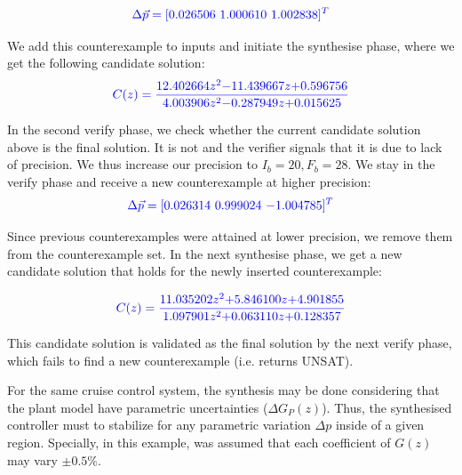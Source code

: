 \documentclass{sig-alternate-05-2015}
\newcommand{\blue}[1]{{\color{blue}#1}}
\newcommand{\red}[1]{{\color{red}#1}}
\begin{document}
$$
\blue{
\Delta{\vec{p}} = [0.026506~ 1.000610~ 1.002838]^T
}
$$



We add this counterexample to {\sc inputs} and initiate the {\sc synthesise} phase, where we get the following candidate solution: 
$$
\blue{
C(z)=\frac{12.402664z^2{-}11.439667z{+}0.596756}{4.003906z^2{-}0.287949z{+}0.015625}
}
$$

In the second {\sc verify} phase, we check whether the current candidate
solution above is the final solution. It is not and the verifier signals
that it is due to lack of precision. We thus increase our precision to
$I_b=20,F_b=28$.
%
We stay in the {\sc verify} phase and receive a new counterexample at
higher precision:
%
$$
\blue{
\Delta{\vec{p}} = [0.026314~ 0.999024~ {-}1.004785]^T
}
$$

Since previous counterexamples were attained at lower precision, we 
remove them from the counterexample set. In the next {\sc synthesise}
phase, we get a new candidate solution that holds for the newly
inserted counterexample:

$$
\blue{
C(z)=\frac{11.035202z^2{+}5.846100z{+}4.901855}{1.097901z^2{+}0.063110z{+}0.128357}
}
$$
%

This candidate solution is validated as the final solution by the next 
{\sc verify} phase, which fails to find a new counterexample (i.e. returns UNSAT).

\blue{
For the same cruise control system, the synthesis may be done considering that the plant model have parametric uncertainties ($\Delta G_{P}(z)$). Thus, the synthesised controller must to stabilize for any parametric variation $\Delta p$ inside of a given region. Specially, in this example, was assumed that each coefficient of $G(z)$ may vary $\pm 0.5\%$.
}
\end{document}
